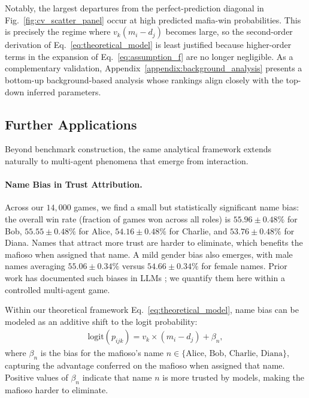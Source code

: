\documentclass[sigconf]{aamas}
\begin{document}
Notably, the largest departures from the perfect-prediction diagonal in Fig.~\ref{fig:cv_scatter_panel} occur at high predicted mafia-win probabilities. This is precisely the regime where $v_k(m_i-d_j)$ becomes large, so the second-order derivation of Eq.~\eqref{eq:theoretical_model} is least justified because higher-order terms in the expansion of Eq.~\eqref{eq:assumption_f} are no longer negligible. As a complementary validation, Appendix~\ref{appendix:background_analysis} presents a bottom-up background-based analysis whose rankings align closely with the top-down inferred parameters.

\subsection{Further Applications}
\label{sec:serendipitous_results}

Beyond benchmark construction, the same analytical framework extends naturally to multi-agent phenomena that emerge from interaction.

\paragraph{Name Bias in Trust Attribution.}

Across our $14{,}000$ games, we find a small but statistically significant name bias: the overall win rate (fraction of games won across all roles) is $55.96\pm 0.48\%$ for Bob, $55.55\pm 0.48\%$ for Alice, $54.16\pm 0.48\%$ for Charlie, and $53.76\pm 0.48\%$ for Diana. Names that attract more trust are harder to eliminate, which benefits the mafioso when assigned that name. A mild gender bias also emerges, with male names averaging $55.06 \pm 0.34\%$ versus $54.66 \pm 0.34\%$ for female names. Prior work has documented such biases in LLMs \citep{bai2024social}; we quantify them here within a controlled multi-agent game.

Within our theoretical framework Eq.~\ref{eq:theoretical_model}, name bias can be modeled as an additive shift to the logit probability:
\begin{align}
\text{logit}(p_{ijk}) = v_k \times (m_i - d_j) + \beta_n,
\label{eq:model_with_name_bias}
\end{align}
where $\beta_n$ is the bias for the mafioso's name $n \in \{\text{Alice, Bob, Charlie, Diana}\}$, capturing the advantage conferred on the mafioso when assigned that name. Positive values of $\beta_n$ indicate that name $n$ is more trusted by models, making the mafioso harder to eliminate.
\end{document}
